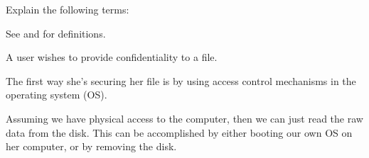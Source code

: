 \documentclass[svv,addpoints]{miunexam}
\begin{document}
\begin{questions}
  \question\label{q:crypto:E}
  Explain the following terms:
  \begin{solution}
    See \cite{Gollmann2011cs} and \cite{Anderson2008sea} for definitions.
  \end{solution}


  \question\label{q:crypto:accessctrl:E:C}
  A user wishes to provide confidentiality to a file.
  \begin{solution}
    The first way she's securing her file is by using access control mechanisms 
    in the operating system (OS).

    Assuming we have physical access to the computer, then we can just read the 
    raw data from the disk.
    This can be accomplished by either booting our own OS on her computer, or 
    by removing the disk.


\end{solution}
\end{questions}
\end{document}
